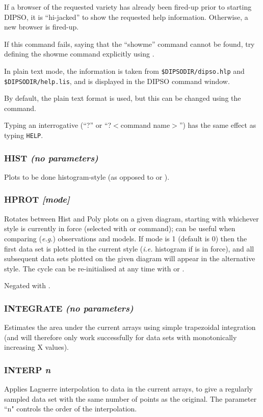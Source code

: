 \documentclass[twoside,11pt,noabs,nolof]{starlink}
\providecommand{\dipcom}[3]{\subsubsection*{\label{COM:#1}\textbf{#1} \emph{#2}}}
\begin{document}
\begin{terminalv}
\end{terminalv}

If a browser of the requested variety has already been fired-up prior to
starting DIPSO, it is ``hi-jacked'' to show the requested help
information. Otherwise, a new browser is fired-up.

If this command fails, saying that the ``showme'' command cannot be found,
try defining the showme command explicitly using
.

In plain text mode, the information is taken from
{\texttt{\$DIPSODIR/dipso.hlp}} and {\texttt{\$DIPSODIR/help.lis}}, and is
displayed in the DIPSO command window.

By default, the plain text format is used, but this can be changed using the
 command.

Typing an interrogative (``?'' or ``?$<$command name$>$'') has the same effect
as typing {\texttt{HELP}}.

\dipcom{HIST}{(no parameters)}{Causes plots to be done in histogram-style}
Plots to be done histogram-style (as opposed to   or ).


\dipcom{HPROT}{[mode]}{Rotates between {\texttt{HIST}} and {\texttt{POLY}} plots on a given diagram}
Rotates between Hist and Poly plots on a given diagram, starting with
whichever style is currently in force (selected with   or 
command); can be useful when comparing (\emph{e.g.}) observations and
models. If mode is 1 (default is 0) then the first data set is plotted
in the current style (\emph{i.e.} histogram if   is in force), and
all subsequent data sets plotted on the given diagram will appear in
the alternative style. The cycle can be re-initialised at any time
with   or .

Negated with .

\dipcom{INTEGRATE}{(no parameters)}{Estimates the area under the current arrays}
Estimates the area under the current arrays using simple trapezoidal
integration (and will therefore only work successfully for data sets
with monotonically increasing X values).

\dipcom{INTERP}{n}{Re-grid current arrays onto a regular grid}
Applies Laguerre interpolation to data in the current arrays, to give
a regularly sampled data set with the same number of points as the
original. The parameter ``n" controls the order of the interpolation.
\end{document}
